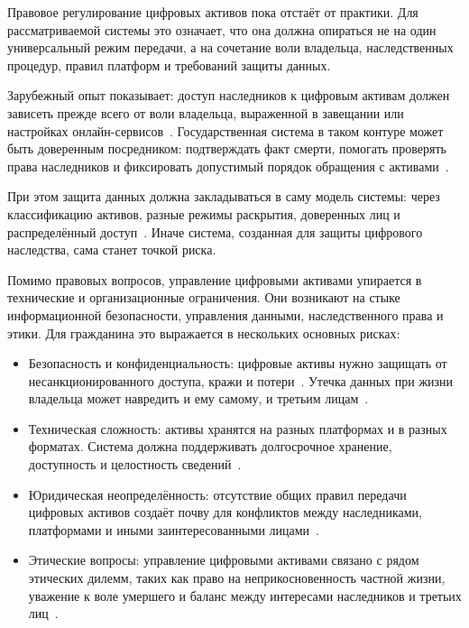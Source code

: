 Правовое регулирование цифровых активов пока отстаёт от практики. Для рассматриваемой системы это означает, что она должна опираться не на один универсальный режим передачи, а на сочетание воли владельца, наследственных процедур, правил платформ и требований защиты данных.

Зарубежный опыт показывает: доступ наследников к цифровым активам должен зависеть прежде всего от воли владельца, выраженной в завещании или настройках онлайн-сервисов~\cite{RUFADAA2015, FrenchDigitalInheritanceLaw2016}. Государственная система в таком контуре может быть доверенным посредником: подтверждать факт смерти, помогать проверять права наследников и фиксировать допустимый порядок обращения с активами~\cite{nist80063_4_2025}.

При этом защита данных должна закладываться в саму модель системы: через классификацию активов, разные режимы раскрытия, доверенных лиц и распределённый доступ~\cite{iso27001_2022, nist80053r5_2020}. Иначе система, созданная для защиты цифрового наследства, сама станет точкой риска.


Помимо правовых вопросов, управление цифровыми активами упирается в технические и организационные ограничения. Они возникают на стыке информационной безопасности, управления данными, наследственного права и этики. Для гражданина это выражается в нескольких основных рисках:

\begin{itemize}
  \item Безопасность и конфиденциальность: цифровые активы нужно защищать от несанкционированного доступа, кражи и потери~\cite{enisaThreatLandscape2023, iso27001_2022, nist80053r5_2020}. Утечка данных при жизни владельца может навредить и ему самому, и третьим лицам~\cite{enisaThreatLandscape2023}.
  \item Техническая сложность: активы хранятся на разных платформах и в разных форматах. Система должна поддерживать долгосрочное хранение, доступность и целостность сведений~\cite{iso14721_2025, iso16363_2025, iso19005_4_2020}.
  \item Юридическая неопределённость: отсутствие общих правил передачи цифровых активов создаёт почву для конфликтов между наследниками, платформами и иными заинтересованными лицами~\cite{Orlov2024Moluch, Haritonova2024HSE}.
  \item Этические вопросы: управление цифровыми активами связано с рядом этических дилемм, таких как право на неприкосновенность частной жизни, уважение к воле умершего и баланс между интересами наследников и третьих лиц~\cite{Edwards2013PostMortemPrivacy, Harbinja2022DigitalDeath}.
\end{itemize}

